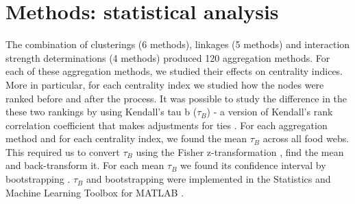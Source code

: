 \section*{Methods: statistical analysis}

	The combination of clusterings (6 methods), linkages (5 methods) and interaction strength determinations (4 methods) produced 120 aggregation methods. For each of these aggregation methods, we studied their effects on centrality indices. More in particular, for each centrality index we studied how the nodes were ranked before and after the process. It was possible to study the difference in the these two rankings by using Kendall's tau b ($\tau_B$) - a version of Kendall's rank correlation coefficient that makes adjustments for ties \citep{Agresti2012}. For each aggregation method and for each centrality index, we found the mean $\tau_B$ across all food webs. This required us to convert $\tau_B$ using the Fisher z-transformation \citep{Fisher1915}, find the mean and back-transform it. For each mean $\tau_B$ we found its confidence interval by bootstrapping \citep{DiCiccio1996}. $\tau_B$ and bootstrapping were implemented in the Statistics and Machine Learning Toolbox for MATLAB \citep{MathworksInc.2019}.
